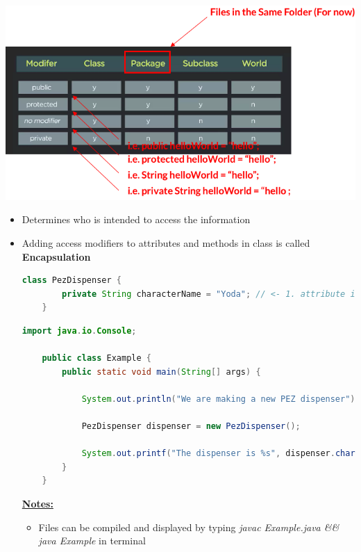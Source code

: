\documentclass[12pt]{article}
\begin{document}
\begin{center}
\includegraphics[width=\linewidth]{images/part_1_notes_1.png}
\end{center}

\begin{itemize}
    \item Determines who is intended to access the information
    \item Adding access modifiers to attributes and methods in class is called
    \textbf{Encapsulation}

    \begin{lstlisting}[language=Java,caption={lesson\_5/PezDispenser.java}]
    class PezDispenser {
        private String characterName = "Yoda"; // <- 1. attribute is turned private
    }
    \end{lstlisting}

    \bigskip

    \begin{lstlisting}[language=Java,caption={lesson\_5/Example.java}]
    import java.io.Console;

    public class Example {
        public static void main(String[] args) {

            System.out.println("We are making a new PEZ dispenser");

            PezDispenser dispenser = new PezDispenser();

            System.out.printf("The dispenser is %s", dispenser.characterName); // <- 2. and it can't be accessed outside of class
        }
    }
    \end{lstlisting}

    \bigskip

    \underline{\textbf{Notes:}}

    \bigskip

    \begin{itemize}
        \item Files can be compiled and displayed by typing \textit{javac Example.java \&\& java Example}
        in terminal
    \end{itemize}
\end{itemize}
\end{document}
